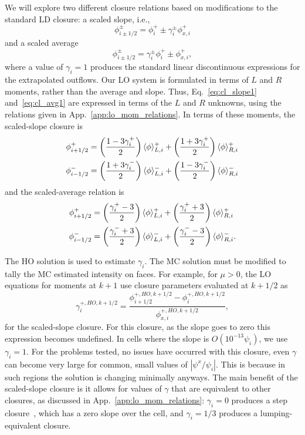 We will
explore two different closure relations based on modifications to the standard LD closure: a scaled slope, i.e.,
\begin{equation}\label{eq:cl_slope1}
    \phi_{i\pm1/2}^\pm = \phi_i^+ \pm \gamma_i^{\pm} \phi_{x,i}^+
\end{equation}
and a scaled average
\begin{equation}\label{eq:cl_avg1}
    \phi_{i\pm1/2}^\pm = \gamma_i^{\pm} \phi_i^+ \pm \phi_{x,i}^+,
\end{equation}
where a value of $\gamma_i = 1$ produces the standard linear discontinuous expressions for
the extrapolated outflows.  Our LO system is formulated in terms of $L$ and $R$ moments, rather than the average and
slope.  Thus, Eq.~\eqref{eq:cl_slope1} and~\eqref{eq:cl_avg1} are expressed in terms of the $L$ and $R$
unknowns, using the relations given in App.~\ref{app:lo_mom_relations}.  In terms of these
moments, the scaled-slope closure is
\begin{align}\label{eq:cl_slope}
    \phi_{i+1/2}^+  &= \left(\frac{\displaystyle 1 - 3 \gamma_i^+}{\displaystyle 2 }  \right)
    \langle \phi \rangle_{L,i}^+ + \left(\frac{\displaystyle 1 + 3 \gamma_i^+}{\displaystyle 2 }  \right)
    \langle \phi \rangle_{R,i}^+ \\
    \phi_{i-1/2}^-  &= \left(\frac{\displaystyle 1 + 3 \gamma_i^-}{\displaystyle 2 }  \right)
    \langle \phi \rangle_{L,i}^- + \left(\frac{\displaystyle 1 - 3 \gamma_i^-}{\displaystyle 2 }  \right)
    \langle \phi \rangle_{R,i}^- 
\end{align}
and the scaled-average relation is
\begin{align}\label{eq:cl_avg}
    \phi_{i+1/2}^+  &= \left(\frac{\displaystyle  \gamma_i^+ - 3}{\displaystyle 2 }  \right)
    \langle \phi \rangle_{L,i}^+ + \left(\frac{\displaystyle \gamma_i^+ + 3}{\displaystyle 2 }  \right)
    \langle \phi \rangle_{R,i}^+ \\
    \phi_{i-1/2}^-  &= \left(\frac{\displaystyle \gamma_i^- + 3}{\displaystyle 2 }  \right)
    \langle \phi \rangle_{L,i}^- + \left(\frac{\displaystyle \gamma_i^- - 3}{\displaystyle 2 }  \right)
    \langle \phi \rangle_{R,i}^- .
\end{align}

The HO solution is used to estimate $\gamma_i$. The MC solution must be modified
to tally the MC estimated intensity on faces. For example, for $\mu>0$, the LO equations for
moments at $k+1$ use closure parameters evaluated at $k+1/2$ as
\begin{equation}
    \gamma_i^{+,HO,k+1/2} = \frac{\phi_{i+1/2}^{+,HO,k+1/2} -
    \phi_{i}^{+,HO,k+1/2}}{\phi_{x,i}^{+,HO,k+1/2}},
\end{equation}
for the scaled-slope closure.  For this closure, as the slope goes to zero this expression
becomes undefined.  In cells where the slope is $O(10^{-13} \psi_i)$, we use $\gamma_i=1$.
For the problems tested, no issues have occurred with this closure, even $\gamma$
can become very large for common, small values of $|\psi^x/\psi_i|$.  This is because in
such regions the solution is changing minimally anyways. 
The main benefit of the scaled-slope closure is it allows for values of $\gamma$ that are
equivalent to other closures, as discussed in App.~\ref{app:lo_mom_relations}:
$\gamma_i=0$ produces a step closure~\cite{larsen_edl}, which has a zero slope over the cell, and $\gamma_i=1/3$
produces a lumping-equivalent closure. 

